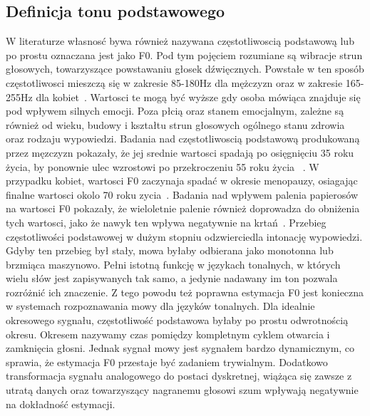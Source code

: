 \documentclass[a4paper,12 pt]{report}
\begin{document}
\subsection{Definicja tonu podstawowego}
W literaturze własnosć bywa również nazywana częstotliwoscią podstawową lub po prostu oznaczana jest jako F0. Pod tym pojęciem rozumiane są wibracje strun głosowych, towarzyszące powstawaniu głosek dźwięcznych. Powstałe w ten sposób częstotliwosci mieszczą się w zakresie 85-180Hz dla mężczyzn oraz w zakresie 165-255Hz dla kobiet~\cite{F0_value}. Wartosci te mogą być wyższe gdy osoba mówiąca znajduje się pod wpływem silnych emocji. Poza płcią oraz stanem emocjalnym, zależne są również od wieku, budowy i kształtu strun głosowych ogólnego stanu zdrowia oraz rodzaju wypowiedzi. Badania nad częstotliwoscią podstawową produkowaną przez męzczyzn pokazały, że jej srednie wartosci spadają po osięgnięciu 35 roku życia, by ponownie ulec wzrostowi po przekroczeniu 55 roku życia ~\cite{Hollien_Ship}. W przypadku kobiet, wartosci F0 zaczynaja spadać w okresie menopauzy, osiagając finalne wartosci okolo 70 roku zycia~\cite{Pegoraro-Krook}. Badania nad wpływem palenia papierosów na wartosci F0 pokazały, że wieloletnie palenie również doprowadza do obniżenia tych wartosci, jako że nawyk ten wpływa negatywnie na krtań~\cite{Gilbert}.
Przebieg częstotliwości podstawowej w dużym stopniu odzwierciedla intonację wypowiedzi. Gdyby ten przebieg był stały, mowa byłaby odbierana jako monotonna lub brzmiąca maszynowo.  Pełni istotną funkcję w językach tonalnych, w których wielu słów jest zapisywanych tak samo, a jedynie nadawany im ton pozwala rozróżnić ich znaczenie. Z tego powodu też poprawna estymacja F0 jest konieczna w systemach rozpoznawania mowy dla języków tonalnych.
Dla idealnie okresowego sygnału, częstotliwość podstawowa byłaby po prostu odwrotnością okresu. Okresem nazywamy czas pomiędzy kompletnym cyklem otwarcia i zamknięcia głosni. Jednak sygnał mowy jest sygnałem bardzo dynamicznym, co sprawia, że estymacja F0 przestaje być zadaniem trywialnym. Dodatkowo transformacja sygnału analogowego do postaci dyskretnej, wiążąca się zawsze z utratą danych oraz towarzyszący nagranemu głosowi szum wpływają negatywnie na dokładność estymacji. 
\end{document}
